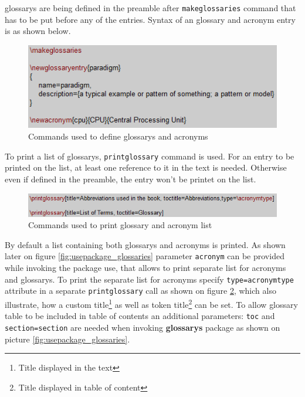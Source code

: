 \Glspl{glossary} are being defined in the preamble after \texttt{\bs makeglossaries} command that has to be put before any of the entries. Syntax of an \gls{glossary} and acronym entry is as shown below.

\begin{figure}[H]
\centering
\includegraphics[scale=1.0]{content/LaTeX/figures/glossary_definition.png}
\caption{Commands used to define \glspl{glossary} and acronyms}
\label{fig:glossary_definition}
\end{figure}

To print a list of \glspl{glossary}, \texttt{\bs printglossary} command is used. For an entry to be printed on the list, at least one reference to it in the text is needed. Otherwise even if defined in the preamble, the entry won't be printet on the list.

\begin{figure}[H]
\centering
\includegraphics[scale=1.0]{content/LaTeX/figures/printglossary.png}
\caption{Commands used to print \gls{glossary} and acronym list}
\label{fig:printglossary}
\end{figure}

By default a list containing both \glspl{glossary} and acronyms is printed. As shown later on figure \ref{fig:usepackage_glossaries} \gls{parameter} \texttt{acronym} can be provided while invoking the package use, that allows to print separate list for acronyms and \glspl{glossary}. To print the separate list for acronyms specify \texttt{type=\bs acronymtype} attribute in a separate \texttt{\bs printglossary} call as shown on figure \ref{fig:printglossary}, which also illustrate, how a custom title\footnote{Title displayed in the text} as well as token title\footnote{Title displayed in table of content} can be set. To allow \gls{glossary} table to be included in table of contents an additional parameters: \texttt{toc} and \texttt{section=section} are needed when invoking \textbf{\glspl{glossary}} package as shown on picture \ref{fig:usepackage_glossaries}.

